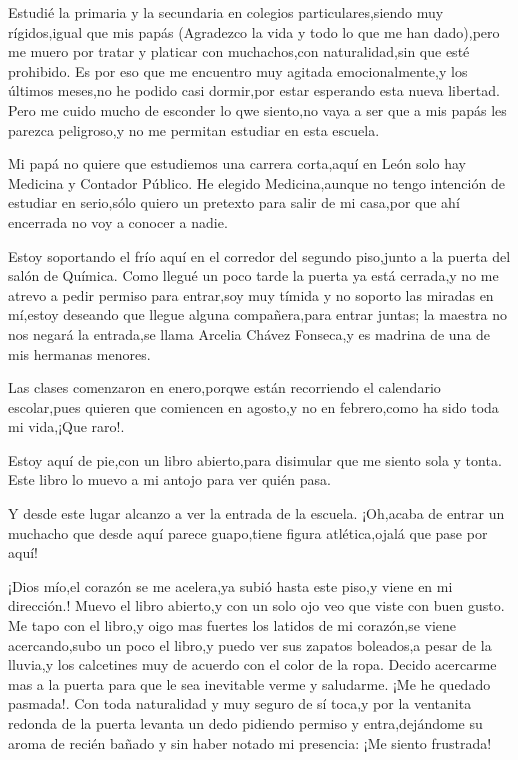 \documentclass[letterpaper,12pt]{book}
\begin{document}
Estudié la primaria y la secundaria en colegios particulares,siendo muy rígidos,igual que mis papás (Agradezco la vida y todo lo que me han dado),pero me muero por tratar y platicar con muchachos,con naturalidad,sin que esté prohibido. Es por eso que me encuentro muy agitada emocionalmente,y los últimos meses,no he podido casi dormir,por estar esperando esta nueva libertad. Pero me cuido mucho de esconder lo qwe siento,no vaya a ser que a mis papás les parezca peligroso,y no me permitan estudiar en esta escuela.

Mi papá no quiere que estudiemos una carrera corta,aquí en León solo hay Medicina y Contador Público. He elegido Medicina,aunque no tengo intención de estudiar en serio,sólo quiero un pretexto para salir de mi casa,por que ahí encerrada no voy a conocer a nadie.

Estoy soportando el frío aquí en el corredor del segundo piso,junto a la puerta del salón de Química. Como llegué un poco tarde la puerta ya está cerrada,y no me atrevo a pedir permiso para entrar,soy muy tímida y no soporto las miradas en mí,estoy deseando que llegue alguna compañera,para entrar juntas; la maestra no nos negará la entrada,se llama Arcelia Chávez Fonseca,y es madrina de una de mis hermanas menores.

Las clases comenzaron en enero,porqwe están recorriendo el calendario escolar,pues quieren que comiencen en agosto,y no en febrero,como ha sido toda mi vida,¡Que raro!.

Estoy aquí de pie,con un libro abierto,para disimular que me siento sola y tonta. Este libro lo muevo a mi antojo para ver quién pasa.
 
Y desde este lugar alcanzo a ver la entrada de la escuela. ¡Oh,acaba de entrar un muchacho que desde aquí parece guapo,tiene figura atlética,ojalá que pase por aquí!

¡Dios mío,el corazón se me acelera,ya subió hasta este piso,y viene en mi dirección.! Muevo el libro abierto,y con un solo ojo veo que viste con buen gusto. Me tapo con el libro,y oigo mas fuertes los latidos de mi corazón,se viene acercando,subo un poco el libro,y puedo ver sus zapatos boleados,a pesar de la lluvia,y los calcetines muy de acuerdo con el color de la ropa. Decido acercarme mas a la puerta para que le sea inevitable verme y saludarme. ¡Me he quedado pasmada!. Con toda naturalidad y muy seguro de sí toca,y por la ventanita redonda de la puerta levanta un dedo pidiendo permiso y entra,dejándome su aroma de recién bañado y sin haber notado mi presencia: ¡Me siento frustrada!
\end{document}
